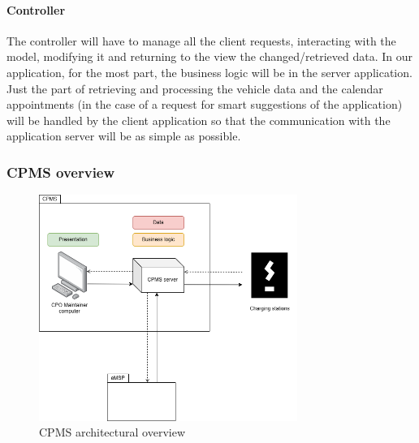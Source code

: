 \paragraph{Controller}
The controller will have to manage all the client requests, interacting with the model, modifying it and returning to the view the changed/retrieved data.
In our application, for the most part, the business logic will be in the server application. Just the part of retrieving and processing the vehicle data and the calendar appointments (in the case of a request for smart suggestions of the application) will be handled by the client application so that the communication with the application server will be as simple as possible.

\subsubsection{\ac{CPMS} overview}

\begin{figure}[!h]
    \begin{center}
        \includegraphics[keepaspectratio, width=0.75\textwidth]{Graphics/DD-CPMS-overview.drawio.png}
        \caption{\ac{CPMS} architectural overview}
        \label{fig:CPMS-overview-architecture}
    \end{center}
\end{figure}

